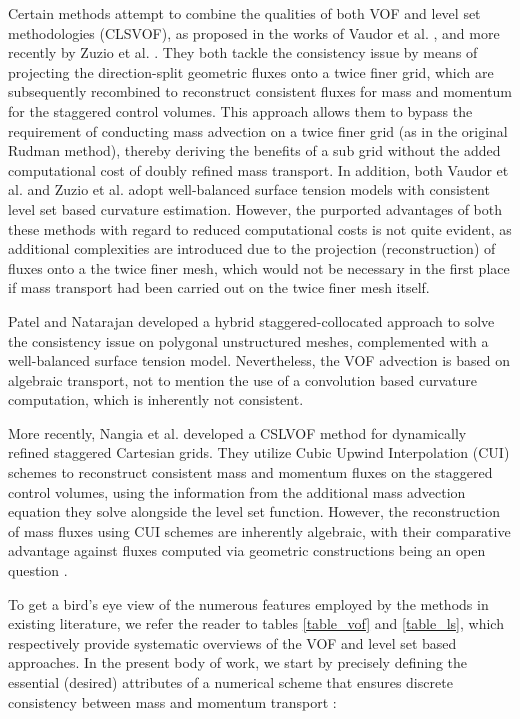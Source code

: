 Certain methods attempt to combine the qualities of both 
VOF and level set methodologies (CLSVOF), as proposed in the works of 
Vaudor et al. , 
and more recently by Zuzio et al. \cite{zuzio2020new}. 
They both tackle the consistency issue by means of projecting 
the direction-split geometric fluxes onto a twice finer grid, 
which are subsequently recombined to reconstruct consistent 
fluxes for mass and momentum for the staggered control volumes. 
This approach allows them to bypass the requirement of conducting 
mass advection on a twice finer grid (as in the original Rudman method), 
thereby deriving the benefits of a sub grid without the 
added computational cost of doubly refined mass transport. 
In addition, both Vaudor et al. \cite{vaudor2017consistent} and 
Zuzio et al.  adopt well-balanced surface tension 
models with consistent level set based curvature estimation. 
However, the purported advantages of both these methods with 
regard to reduced computational costs is not quite evident, 
as additional complexities are introduced due to the projection 
(reconstruction) of fluxes onto a the twice finer mesh, 
which would not be necessary in the first place if mass transport 
had been carried out on the twice finer mesh itself. 


Patel and Natarajan  developed a hybrid 
staggered-collocated approach to solve the consistency issue on 
polygonal unstructured meshes, complemented with a well-balanced surface tension model. 
Nevertheless, the VOF advection is based on algebraic transport, 
not to mention the use of a convolution based 
curvature computation, which is inherently not consistent. 


More recently, Nangia et al.  developed a 
CSLVOF method for dynamically refined staggered Cartesian grids. 
They utilize Cubic Upwind Interpolation (CUI) schemes to 
reconstruct consistent mass and momentum fluxes on the staggered 
control volumes, using the information from the additional mass 
advection equation they solve alongside the level set function.   
However, the reconstruction of mass fluxes using CUI schemes are 
inherently algebraic, with their comparative advantage against fluxes 
computed via geometric constructions being an open question 
.

To get a bird's eye view of the numerous features employed by the methods 
in existing literature, we refer the reader to tables \ref{table_vof} and \ref{table_ls}, 
which respectively provide systematic overviews of the VOF and level set based approaches.    
In the present body of work, we start by precisely defining the
essential (desired) attributes of a numerical scheme that 
ensures discrete consistency between mass and momentum transport : 


